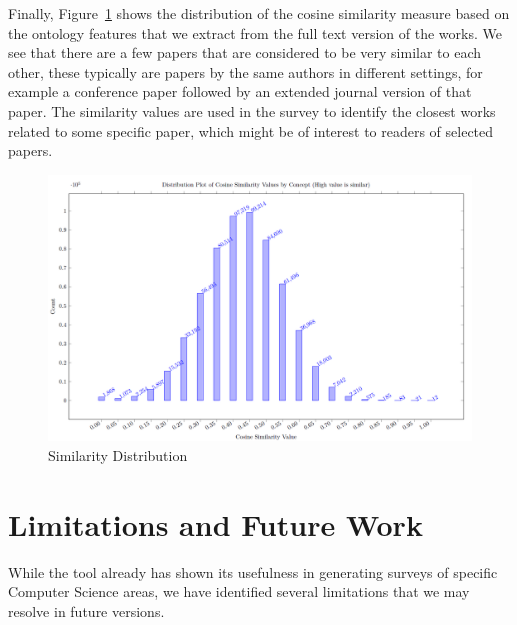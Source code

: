 \documentclass[
 hf]{ceurart}
\begin{document}
Finally, Figure~\ref{fig:similarity} shows the distribution of the cosine similarity measure based on the ontology features that we extract from the full text version of the works. We see that there are a few papers that are considered to be very similar to each other, these typically are papers by the same authors in different settings, for example a conference paper followed by an extended journal version of that paper. The similarity values are used in the survey to identify the closest works related to some specific paper, which might be of interest to readers of selected papers.

\begin{figure}[htbp]
\centering
\includegraphics[width=12cm]{images/similaritydistributioncosine}
\caption{\label{fig:similarity}Similarity Distribution}
\end{figure}

\section{Limitations and Future Work}

While the tool already has shown its usefulness in generating surveys of specific Computer Science areas, we have identified several limitations that we may resolve in future versions.
\end{document}
